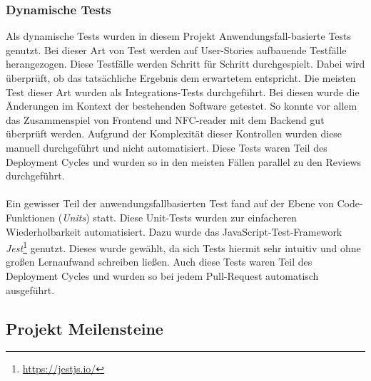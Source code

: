 \documentclass[10pt, a4paper]{article}
\begin{document}
\subsubsection*{Dynamische Tests}
Als dynamische Tests wurden in diesem Projekt Anwendungsfall-basierte Tests genutzt.
Bei dieser Art von Test werden auf User-Stories aufbauende Testfälle herangezogen.
Diese Testfälle werden Schritt für Schritt \glqq durchgespielt\grqq.
Dabei wird überprüft, ob das tatsächliche Ergebnis dem erwartetem entspricht.
Die meisten Test  dieser Art wurden als Integrations-Tests durchgeführt.
Bei diesen wurde die Änderungen im Kontext der bestehenden Software getestet.
So konnte vor allem das Zusammenspiel von Frontend und NFC-reader mit dem Backend gut überprüft werden.
Aufgrund der Komplexität dieser Kontrollen wurden diese manuell durchgeführt und nicht automatisiert.
Diese Tests waren Teil des Deployment Cycles und wurden so in den meisten Fällen parallel zu den Reviews durchgeführt.
\\~\\
Ein gewisser Teil der anwendungsfallbasierten Test fand auf der Ebene von Code-Funktionen (\textit{Units}) statt.
Diese Unit-Tests wurden zur einfacheren Wiederholbarkeit automatisiert.
Dazu wurde das JavaScript-Test-Framework \textit{Jest}\footnote{\raggedright\url{https://jestjs.io/}} genutzt.
Dieses wurde gewählt, da sich Tests hiermit sehr intuitiv und ohne großen Lernaufwand schreiben ließen.
Auch diese Tests waren Teil des Deployment Cycles und wurden so bei jedem Pull-Request automatisch ausgeführt.


\subsection{Projekt Meilensteine}
\end{document}
